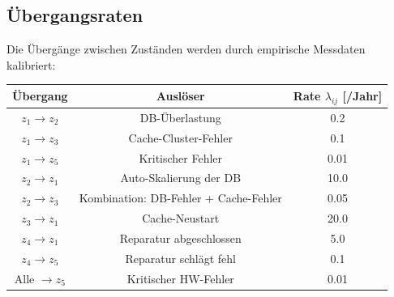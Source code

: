 \documentclass[a4paper,11pt]{article}
\theoremstyle{definition}
\begin{document}
\subsection{Übergangsraten}

Die Übergänge zwischen Zuständen werden durch empirische Messdaten kalibriert:

\begin{table}[H]
    \centering
    \begin{tabular}{|c|c|c|}
        \hline
        \textbf{Übergang} & \textbf{Auslöser} & \textbf{Rate $\lambda_{ij}$ [/Jahr]} \\
        \hline
        $z_1 \to z_2$ & DB-Überlastung & 0.2 \\
        $z_1 \to z_3$ & Cache-Cluster-Fehler & 0.1 \\
        $z_1 \to z_5$ & Kritischer Fehler & 0.01 \\
        $z_2 \to z_1$ & Auto-Skalierung der DB & 10.0 \\
        $z_2 \to z_3$ & Kombination: DB-Fehler + Cache-Fehler & 0.05 \\
        $z_3 \to z_1$ & Cache-Neustart & 20.0 \\
        $z_4 \to z_1$ & Reparatur abgeschlossen & 5.0 \\
        $z_4 \to z_5$ & Reparatur schlägt fehl & 0.1 \\
        Alle $\to z_5$ & Kritischer HW-Fehler & 0.01 \\
        \hline
    \end{tabular}
\end{table}


    
    
\end{document}
